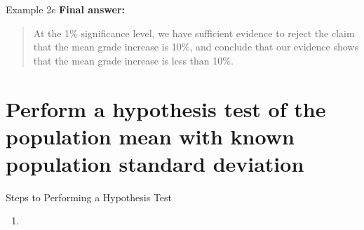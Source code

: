 \documentclass[t]{beamer}
\begin{document}
\begin{frame}{Example 2c}
\textbf{Final answer:}
\begin{quote}
At the 1\% significance level, we have sufficient evidence to reject the claim that the mean grade increase is 10\%, and conclude that our evidence shows that the mean grade increase is less than 10\%.
\end{quote}
\end{frame}

\section{Perform a hypothesis test of the population mean with known population standard deviation}

\begin{frame}{Steps to Performing a Hypothesis Test}
\begin{enumerate}
	\item 
\end{enumerate}
\end{frame}

\end{document}

